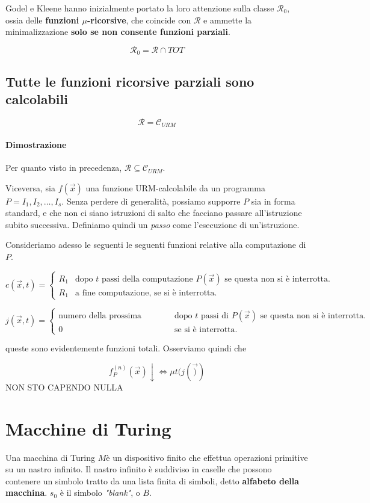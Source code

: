 	Godel e Kleene hanno inizialmente portato la loro attenzione sulla classe $\mathcal{R}_0$, ossia delle \textbf{funzioni $\mu$-ricorsive}, che coincide con $\mathcal{R}$ e ammette la minimalizzazione \textbf{solo se non consente funzioni parziali}.
	
	$$
	\mathcal{R}_0 = \mathcal{R} \cap TOT
	$$
	
	\subsection{Tutte le funzioni ricorsive parziali sono calcolabili}
	$$
	\mathcal{R} = \mathcal{C}_{URM}
	$$
	
	\paragraph{Dimostrazione} 
	
	Per quanto visto in precedenza, $\mathcal{R} \subseteq \mathcal{C}_{URM}$.

	Viceversa, sia $f(\vec{x})$ una funzione URM-calcolabile da un programma $P = I_1, I_2, \dots, I_s$. Senza perdere di generalità, possiamo supporre $P$ sia in forma standard, e che non ci siano istruzioni di salto che facciano passare all'istruzione subito successiva. Definiamo quindi un \textit{passo} come l'esecuzione di un'istruzione. 
	
	Consideriamo adesso le seguenti le seguenti funzioni relative alla computazione di $P$.
	
	$$
	c(\vec{x}, t) = \begin{cases}
	R_1 &\text{dopo $t$ passi della computazione $P(\vec{x})$ se questa non si è interrotta.}\\
	R_1 &\text{a fine computazione, se si è interrotta.}
	\end{cases}
	$$
	
	$$
	j(\vec{x}, t) =  \begin{cases}
		\text{numero della prossima istruzione} &\text{dopo $t$ passi di $P(\vec{x})$ se questa non si è interrotta.}\\
		0 &\text{se si è interrotta.}
	\end{cases}
	$$
	
	queste sono evidentemente funzioni totali. Osserviamo quindi che
	
	$$
	f_P^{(n)}(\vec{x})\downarrow \Leftrightarrow \mu t (j(\vec))
	$$
NON STO CAPENDO NULLA
	
	\section{Macchine di Turing}
	Una macchina di Turing $M$è un dispositivo finito che effettua operazioni primitive su un nastro infinito. Il nastro infinito è suddiviso in caselle che possono contenere un simbolo tratto da una lista finita di simboli, detto \textbf{alfabeto della macchina}. $s_0$ è il simbolo \textit{"blank"}, o $B$.
	
